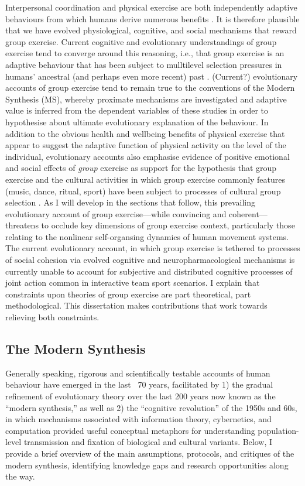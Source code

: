 Interpersonal coordination and physical exercise are both independently adaptive behaviours from which humans derive numerous benefits \citep{Tomasello2014}. It is therefore plausible that we have evolved physiological, cognitive, and social mechanisms that reward group exercise.  Current cognitive and evolutionary understandings of group exercise tend to converge around this reasoning, i.e., that group exercise is an adaptive behaviour that has been subject to mulltilevel selection pressures in humans' ancestral (and perhaps even more recent) past \citep{Sands2012,Dunbar2010,Cohen2017}. (Current?) evolutionary accounts of group exercise tend to remain true to the conventions of the Modern Synthesis (MS), whereby proximate mechanisms are investigated and adaptive value is inferred from the dependent variables of these studies in order to hypothesise about ultimate evolutionary explanation of the behaviour.  In addition to the obvious health and wellbeing benefits of physical exercise that appear to suggest the adaptive function of physical activity on the level of the individual, evolutionary accounts also emphasise evidence of positive emotional and social effects of \textit{group} exercise as support for the hypothesis that group exercise and the cultural activities in which group exercise commonly features (music, dance, ritual, sport) have been subject to processes of cultural group selection \citep{Dunbar2010,Whitehouse2004,Atkinson2011a}.  As I will develop in the sections that follow, this prevailing evolutionary account of group exercise---while convincing and coherent---threatens to occlude key dimensions of group exercise context, particularly those relating to the nonlinear self-organsing dynamics of human movement systems.  The current evolutionary account, in which group exercise is tethered to processes of social cohesion via evolved cognitive and neuropharmacological mechanisms is currently unable to account for subjective and distributed cognitive processes of joint action common in interactive team sport scenarios. I explain that constraints upon theories of group exercise are part theoretical, part methodological.  This dissertation makes contributions that work towards relieving both constraints.

\subsection{The Modern Synthesis}
Generally speaking, rigorous and scientifically testable accounts of human behaviour have emerged in the last ~70 years, facilitated by 1) the gradual refinement of evolutionary theory over the last 200 years now known as the ``modern synthesis,'' as well as 2) the ``cognitive revolution'' of the 1950s and 60s, in which mechanisms associated with information theory, cybernetics, and computation provided useful conceptual metaphors for understanding population-level transmission and fixation of biological and cultural variants. Below, I provide a brief overview of the main assumptions, protocols, and critiques of the modern synthesis, identifying knowledge gaps and research opportunities along the way.

